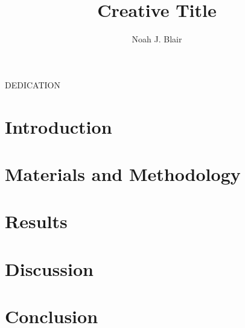 \documentclass[master]{thesis}
\title{Creative Title}
\author{Noah J. Blair}
\begin{document}
 
    \frontmatter 
    \maketitle              %
    \makemycopyright        %
    \makeabstract           %
    \makeacknowledgements   %
    \begin{flatcenter} %

        DEDICATION

        \vfill %

        \noindent \textit{}
        \vfill %
    \end{flatcenter}
    \newpage
    \setcounter{tocdepth}{1}
    \tableofcontents    %
    \listoftables       %
    \listoffigures      %

    \mainmatter %

    \chapter{Introduction}\label{toc:ch.introduction}
    
    \chapter{Materials and Methodology}\label{toc:ch.methodology}
    
    \chapter{Results}\label{toc:ch.results}
    
    \chapter{Discussion}\label{toc:ch.discussion}
    
    \chapter{Conclusion}\label{toc:ch.conclusion}
    
    \backmatter
    
    
\end{document}
